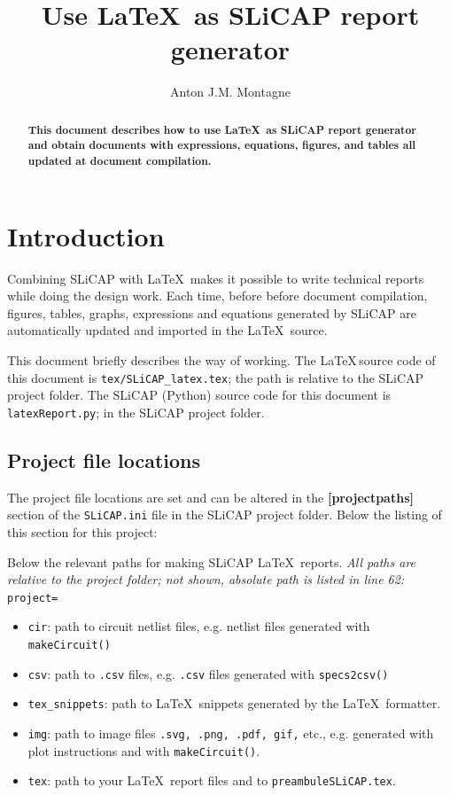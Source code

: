 \documentclass[a4paper,12pt]{article}
\title{Use \LaTeX$\,$ as SLiCAP report generator}
\author{Anton J.M. Montagne}
\begin{document}
\maketitle
\tableofcontents
\newpage
\begin{abstract}
{\textbf{This document describes how to use \LaTeX$\,$ as SLiCAP report generator and
obtain documents with expressions, equations, figures, and tables all updated at document compilation.}}
\end{abstract}
\newpage

\section{Introduction}
Combining SLiCAP with \LaTeX$\,$ makes it possible to write technical reports while doing the design work.
Each time, before before document compilation, figures, tables, graphs, expressions and equations generated by SLiCAP are automatically updated and imported in the \LaTeX$\,$ source.

This document briefly describes the way of working. The \LaTeX$\,$source code of this document is {\texttt{tex/SLiCAP\_latex.tex}}; the path is relative to the SLiCAP project folder. The SLiCAP (Python) source code for this document is {\texttt{latexReport.py}}; in the SLiCAP project folder.

\subsection{Project file locations}\label{sec-project}

The project file locations are set and can be altered in the {\textbf{[projectpaths]}} section of the {\texttt{SLiCAP.ini}} file in the SLiCAP project folder. Below the listing of this section for this project:



Below the relevant paths for making SLiCAP \LaTeX$\,$ reports. {\em{All paths are relative to the project folder; not shown, absolute path is listed in line 62:}} {\texttt{project=}}

\begin{itemize}
 \item {\texttt{cir}}: path to circuit netlist files, e.g. netlist files generated with {\texttt{makeCircuit()}}
 \item {\texttt{csv}}: path to {\texttt{.csv}} files, e.g. {\texttt{.csv}} files generated with {\texttt{specs2csv()}}
 \item {\texttt{tex\_snippets}}: path to \LaTeX$\,$ snippets generated by the \LaTeX$\,$ formatter.
 \item {\texttt{img}}: path to image files {\texttt{.svg, .png, .pdf, gif,} etc.}, e.g. generated with plot instructions and with {\texttt{makeCircuit()}}.
 \item {\texttt{tex}}: path to your \LaTeX$\,$ report files and to {\texttt{preambuleSLiCAP.tex}}.
\end{itemize}
\end{document}
